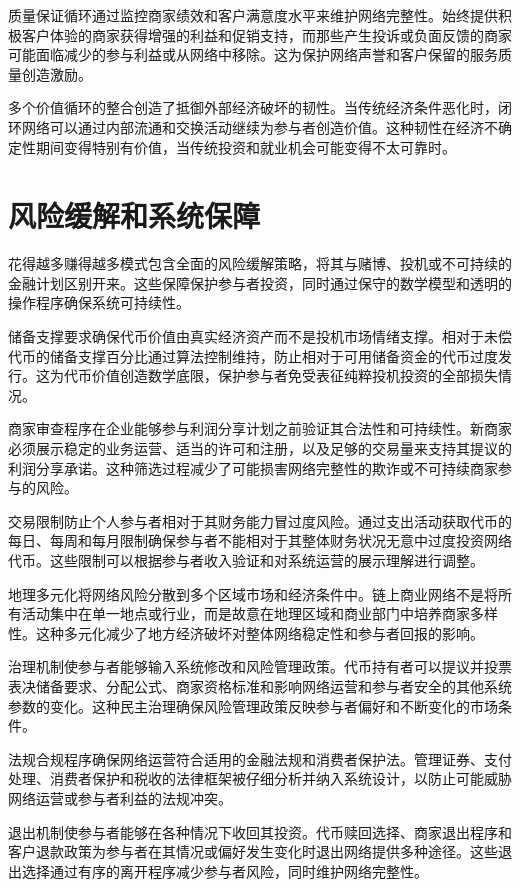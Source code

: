 \documentclass[
  Letterpaper,
]{scrbook}
\begin{document}
质量保证循环通过监控商家绩效和客户满意度水平来维护网络完整性。始终提供积极客户体验的商家获得增强的利益和促销支持，而那些产生投诉或负面反馈的商家可能面临减少的参与利益或从网络中移除。这为保护网络声誉和客户保留的服务质量创造激励。

多个价值循环的整合创造了抵御外部经济破坏的韧性。当传统经济条件恶化时，闭环网络可以通过内部流通和交换活动继续为参与者创造价值。这种韧性在经济不确定性期间变得特别有价值，当传统投资和就业机会可能变得不太可靠时。

\section{风险缓解和系统保障}\label{ux98ceux9669ux7f13ux89e3ux548cux7cfbux7edfux4fddux969c}

花得越多赚得越多模式包含全面的风险缓解策略，将其与赌博、投机或不可持续的金融计划区别开来。这些保障保护参与者投资，同时通过保守的数学模型和透明的操作程序确保系统可持续性。

储备支撑要求确保代币价值由真实经济资产而不是投机市场情绪支撑。相对于未偿代币的储备支撑百分比通过算法控制维持，防止相对于可用储备资金的代币过度发行。这为代币价值创造数学底限，保护参与者免受表征纯粹投机投资的全部损失情况。

商家审查程序在企业能够参与利润分享计划之前验证其合法性和可持续性。新商家必须展示稳定的业务运营、适当的许可和注册，以及足够的交易量来支持其提议的利润分享承诺。这种筛选过程减少了可能损害网络完整性的欺诈或不可持续商家参与的风险。

交易限制防止个人参与者相对于其财务能力冒过度风险。通过支出活动获取代币的每日、每周和每月限制确保参与者不能相对于其整体财务状况无意中过度投资网络代币。这些限制可以根据参与者收入验证和对系统运营的展示理解进行调整。

地理多元化将网络风险分散到多个区域市场和经济条件中。链上商业网络不是将所有活动集中在单一地点或行业，而是故意在地理区域和商业部门中培养商家多样性。这种多元化减少了地方经济破坏对整体网络稳定性和参与者回报的影响。

治理机制使参与者能够输入系统修改和风险管理政策。代币持有者可以提议并投票表决储备要求、分配公式、商家资格标准和影响网络运营和参与者安全的其他系统参数的变化。这种民主治理确保风险管理政策反映参与者偏好和不断变化的市场条件。

法规合规程序确保网络运营符合适用的金融法规和消费者保护法。管理证券、支付处理、消费者保护和税收的法律框架被仔细分析并纳入系统设计，以防止可能威胁网络运营或参与者利益的法规冲突。

退出机制使参与者能够在各种情况下收回其投资。代币赎回选择、商家退出程序和客户退款政策为参与者在其情况或偏好发生变化时退出网络提供多种途径。这些退出选择通过有序的离开程序减少参与者风险，同时维护网络完整性。
\end{document}
